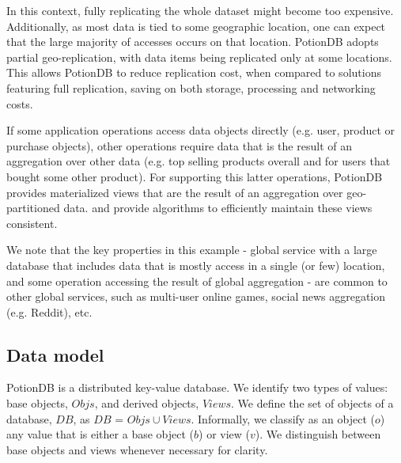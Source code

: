 \documentclass[sigconf, nonacm]{acmart}
\begin{document}
In this context, fully replicating the whole dataset might become too expensive.
Additionally, as most data is tied to some geographic location, one can expect that the large majority of accesses
occurs on that location. 
PotionDB adopts partial geo-replication, with data items being replicated only at some locations.
This allows PotionDB to reduce replication cost, when
compared to solutions featuring full replication, saving on both storage, processing and networking costs.

If some application operations access data objects directly (e.g. user, product or purchase objects),
other operations require data that is the result of an aggregation over other data (e.g.  top
selling products overall and for users that bought some other product).  For supporting this latter operations,
PotionDB provides materialized views that are the result of an aggregation 
over geo-partitioned data. and provide algorithms to efficiently maintain these views consistent.

We note that the key properties in this example - global service with a large database that includes
data that is mostly access in a single (or few) location,  and some operation accessing the result
of global aggregation - are common to other global services, such as multi-user online games,
social news aggregation (e.g.  Reddit), etc.



\subsection{Data model}
\label{subsec:datamodel}

PotionDB is a distributed key-value database.
We identify two types of values: base objects, $\mathit{Objs}$, and derived objects, $\mathit{Views}$.
We define the set of objects of a database, $\mathit{DB}$, as $\mathit{DB}$ = $\mathit{Objs} \cup \mathit{Views}$.
Informally, we classify as an object ($o$) any value that is either a base object ($b$) or view ($v$).
We distinguish between base objects and views whenever necessary for clarity.
\end{document}
